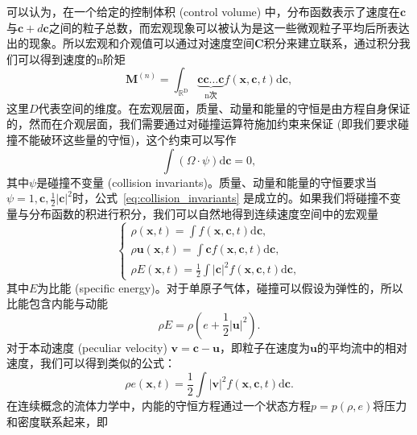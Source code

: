 可以认为，在一个给定的控制体积 (control volume) 中，分布函数表示了速度在$\mathbf{c}$与$\mathbf{c}+d\mathbf{c}$之间的粒子总数，而宏观现象可以被认为是这一些微观粒子平均后所表达出的现象。所以宏观和介观值可以通过对速度空间$\mathbf{C}$积分来建立联系，通过积分我们可以得到速度的n阶矩
\begin{equation}
    \boldsymbol{M}^{(n)}=\int_{\mathbb{R}^{\mathrm{D}}} \underbrace{\mathbf{c} \mathbf{c} \ldots \mathbf{c}}_{\mathrm{n} \text {次}} f(\boldsymbol{x}, \mathbf{c}, t) \mathrm{d} \mathbf{c},
\end{equation}
这里$D$代表空间的维度。在宏观层面，质量、动量和能量的守恒是由方程自身保证的，然而在介观层面，我们需要通过对碰撞运算符施加约束来保证 (即我们要求碰撞不能破环这些量的守恒)，这个约束可以写作
\begin{equation}
    \int\left(\Omega \cdot \psi\right) \mathrm{d} \mathbf{c}=0,
    \label{eq:collision_invariants}
\end{equation}
其中$\psi$是碰撞不变量 (collision invariants)。质量、动量和能量的守恒要求当$\psi=1, \mathbf{c}, \frac{1}{2}|\mathbf{c}|^2$时，公式~\ref{eq:collision_invariants} 是成立的。如果我们将碰撞不变量与分布函数的积进行积分，我们可以自然地得到连续速度空间中的宏观量
\begin{equation}
    \left\{
        \begin{array}
        {l}\rho(\boldsymbol{x}, t)=\int f(\boldsymbol{x}, \mathbf{c}, t) \mathrm{d} \mathbf{c} , \\
        \rho \boldsymbol{u}(\boldsymbol{x}, t)=\int \mathbf{c} f(\boldsymbol{x}, \mathbf{c}, t) \mathrm{d} \mathbf{c} , \\
        \rho E(\boldsymbol{x}, t)=\frac{1}{2} \int|\mathbf{c}|^2 f(\boldsymbol{x}, \mathbf{c}, t) \mathrm{d} \mathbf{c} ,
        \end{array}
    \right.
    \label{eq:rho_u}
\end{equation}
其中$E$为比能 (specific energy)。对于单原子气体，碰撞可以假设为弹性的，所以比能包含内能与动能
\begin{equation}
    \rho E=\rho\left(e+\frac{1}{2}|\boldsymbol{u}|^2\right).
\end{equation}
对于本动速度 (peculiar velocity) $\boldsymbol{v}=\mathbf{c}-\boldsymbol{u}$，即粒子在速度为$\boldsymbol{u}$的平均流中的相对速度，我们可以得到类似的公式：
\begin{equation}
    \rho e(\boldsymbol{x}, t)=\frac{1}{2} \int|\boldsymbol{v}|^2 f(\boldsymbol{x}, \mathbf{c}, t) \mathrm{d} \mathbf{c}.
\end{equation}
在连续概念的流体力学中，内能的守恒方程通过一个状态方程$p=p(\rho,e)$将压力和密度联系起来，即
